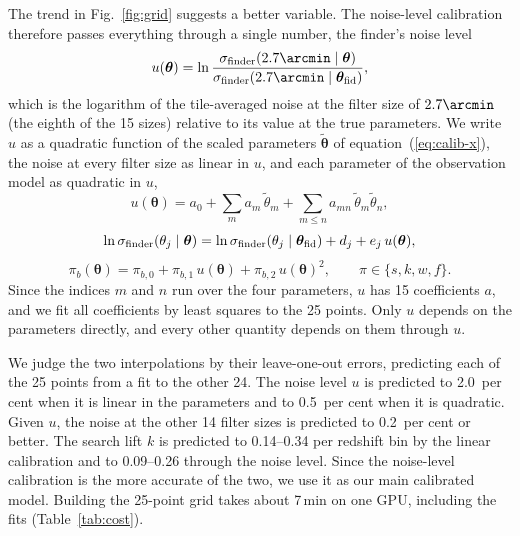 The trend in Fig.~\ref{fig:grid} suggests a better variable. The noise-level calibration therefore passes
everything through a single number, the finder's noise level
\begin{equation}
u(\bm{\theta}) = \ln\frac{\sfinder(2.7\arcmin \mid \bm{\theta})}{\sfinder(2.7\arcmin \mid \bm{\theta}_\mathrm{fid})},
\label{eq:calib-u}
\end{equation}
which is the logarithm of the tile-averaged noise at the filter size of $2.7\arcmin$ (the eighth of the 15
sizes) relative to its value at the true parameters. We write $u$ as a quadratic function of the scaled
parameters $\tilde{\bm{\theta}}$ of equation~(\ref{eq:calib-x}), the noise at every filter size as linear in
$u$, and each parameter of the observation model as quadratic in $u$,
\begin{equation}
u(\bm{\theta}) = a_0 + \sum_m a_m\,\tilde\theta_m + \sum_{m\le n} a_{mn}\,\tilde\theta_m \tilde\theta_n,
\label{eq:calib-u-fit}
\end{equation}
\begin{equation}
\ln\sigma_\mathrm{finder}(\theta_j \mid \bm{\theta}) = \ln\sigma_\mathrm{finder}(\theta_j \mid \bm{\theta}_\mathrm{fid}) + d_j + e_j\,u(\bm{\theta}),
\label{eq:calib-noise-sigma}
\end{equation}
\begin{equation}
\pi_b(\bm{\theta}) = \pi_{b,0} + \pi_{b,1}\,u(\bm{\theta}) + \pi_{b,2}\,u(\bm{\theta})^2,\qquad \pi \in \{s, k, w, f\}.
\label{eq:calib-noise-c}
\end{equation}
Since the indices $m$ and $n$ run over the four parameters, $u$ has 15 coefficients $a$, and we fit all
coefficients by least squares to the 25 points. Only $u$ depends on the parameters directly, and every other
quantity depends on them through $u$.

We judge the two interpolations by their leave-one-out errors, predicting each of the 25 points from a fit to
the other 24. The noise level $u$ is predicted to 2.0~per cent when it is linear in the parameters and to
0.5~per cent when it is quadratic. Given $u$, the noise at the other 14 filter sizes is predicted to
0.2~per cent or better. The search lift $k$ is predicted to 0.14--0.34 per redshift bin by the linear
calibration and to 0.09--0.26 through the noise level. Since the noise-level calibration is the more accurate
of the two, we use it as our main calibrated model. Building the 25-point grid takes about 7\,min on one GPU,
including the fits (Table~\ref{tab:cost}).

